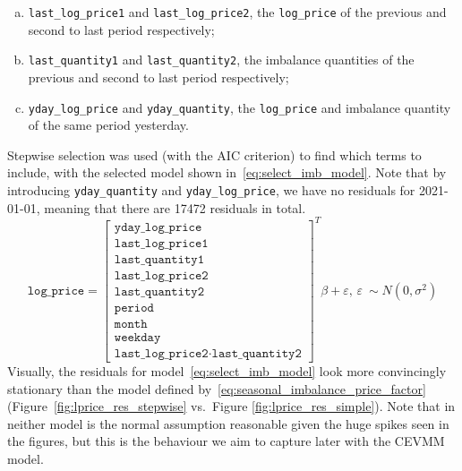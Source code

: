 \documentclass[11pt,twoside,openany]{book}
\newcommand{\eps}{\varepsilon}
\newcommand{\code}[1]{\texttt{#1}}
\numberwithin{Theorem}{chapter}
\numberwithin{Definition}{chapter}
\numberwithin{Lemma}{chapter}
\numberwithin{Algorithm}{chapter}
\numberwithin{equation}{chapter}
\begin{document}
\begin{enumerate}[(a)]
  \item \code{last_log_price1} and \code{last_log_price2},
    the \code{log_price} of the previous and second to last period respectively;
  \item \code{last_quantity1} and \code{last_quantity2},
    the imbalance quantities of the previous and second to last
    period respectively;
  \item \code{yday_log_price} and \code{yday_quantity}, the \code{log_price}
    and imbalance quantity of the same period yesterday.
\end{enumerate}

Stepwise selection was used (with the AIC criterion) to find which terms to include,
with the selected model shown in~\eqref{eq:select_imb_model}.
Note that by introducing \code{yday_quantity} and \code{yday_log_price},
we have no residuals for 2021-01-01, meaning that there are 17472 residuals in total.
\begin{equation}\label{eq:select_imb_model}
  \code{log_price} = \begin{bmatrix}
    \code{yday_log_price} \\
    \code{last_log_price1}\\
    \code{last_quantity1}\\
    \code{last_log_price2}\\
    \code{last_quantity2}\\
    \code{period} \\
    \code{month} \\
    \code{weekday}\\
  \code{last_log_price2}\cdot\code{last_quantity2}
\end{bmatrix}^T\beta + \eps,\,\eps~\sim N(0,\sigma^2)
\end{equation}
Visually, the residuals for model~\eqref{eq:select_imb_model} look more
convincingly stationary
than the model defined by~\eqref{eq:seasonal_imbalance_price_factor}
(Figure~\ref{fig:lprice_res_stepwise} vs.\ Figure \ref{fig:lprice_res_simple}).
Note that in neither model is the normal assumption reasonable given the huge spikes seen
in the figures, but this is the behaviour we aim to capture later with the CEVMM model.

\FloatBarrier
\end{document}
